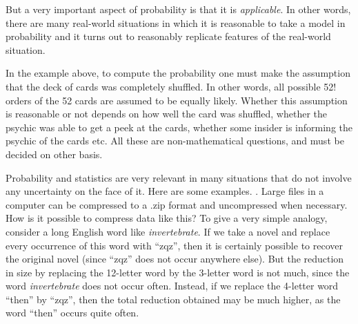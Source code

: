 \documentclass[preprint,  11pt]{amsart}
\begin{document}
But a very important aspect of probability is that it is {\em applicable}. In other words, there are many real-world situations in which it is reasonable to take a model in probability and it turns out to reasonably replicate features of  the real-world situation.

In the example above, to compute the probability one must make the assumption that the deck of cards was completely shuffled. In other words, all possible 52! orders of the 52 cards are assumed to be equally likely. Whether this assumption is reasonable or not depends on how well the card was shuffled, whether the psychic was able to get a peek at the cards, whether some insider is informing the psychic of the cards etc. All these are non-mathematical questions, and must be decided on other basis.

 Probability and statistics are very relevant in many situations that do not involve any uncertainty on the face of it. Here are some examples.
. Large files in a computer can be compressed to a .zip format and uncompressed when necessary. How is it possible to compress data like this? To give a very simple analogy, consider a long English word like {\em invertebrate}. If we take a novel and replace every occurrence of this word with ``zqz'', then  it is certainly possible to recover the original novel (since ``zqz'' does not occur anywhere else). But the reduction in size by replacing the 12-letter word by the 3-letter word is not much, since the word {\em invertebrate} does not occur often. Instead, if we replace the 4-letter word ``then'' by ``zqz'', then the total reduction obtained may be much higher, as the word ``then'' occurs quite often.
\end{document}
